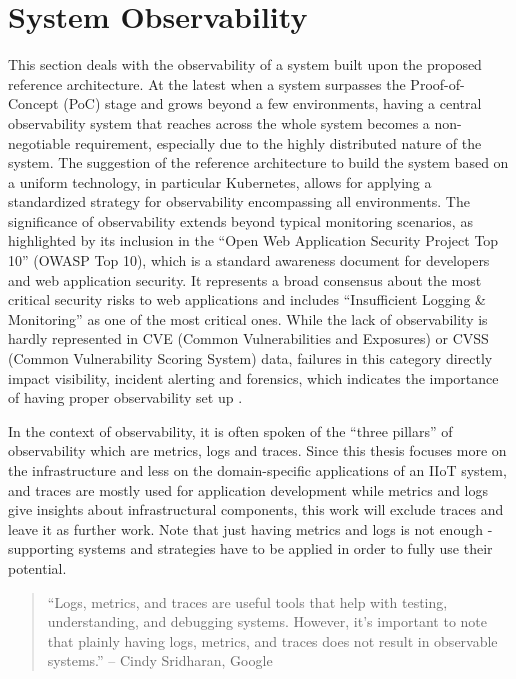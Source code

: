 \section{System Observability}
\label{section:observability}
    This section deals with the observability of a system built upon the proposed reference architecture. At the latest when a system surpasses the Proof-of-Concept (PoC) stage and grows beyond a few environments, having a central observability system that reaches across the whole system becomes a non-negotiable requirement, especially due to the highly distributed nature of the system. The suggestion of the reference architecture to build the system based on a uniform technology, in particular Kubernetes, allows for applying a standardized strategy for observability encompassing all environments. The significance of observability extends beyond typical monitoring scenarios, as highlighted by its inclusion in the ``Open Web Application Security Project Top 10'' (OWASP Top 10), which is a standard awareness document for developers and web application security. It represents a broad consensus about the most critical security risks to web applications and includes ``Insufficient Logging \& Monitoring'' as one of the most critical ones. While the lack of observability is hardly represented in CVE (Common Vulnerabilities and Exposures) or CVSS (Common Vulnerability Scoring System) data, failures in this category directly impact visibility, incident alerting and forensics, which indicates the importance of having proper observability set up \cite{owasp_top_ten}.\newline

    \noindent In the context of observability, it is often spoken of the ``three pillars'' of observability which are metrics, logs and traces. Since this thesis focuses more on the infrastructure and less on the domain-specific applications of an IIoT system, and traces are mostly used for application development while metrics and logs give insights about infrastructural components, this work will exclude traces and leave it as further work. Note that just having metrics and logs is not enough - supporting systems and strategies have to be applied in order to fully use their potential.

    \begin{quote}
        ``Logs, metrics, and traces are useful tools that help with testing, understanding, and debugging systems. However, it’s important to note that plainly having logs, metrics, and traces does not result in observable systems.'' -- Cindy Sridharan, Google \cite{need_for_observability}
    \end{quote}
    
